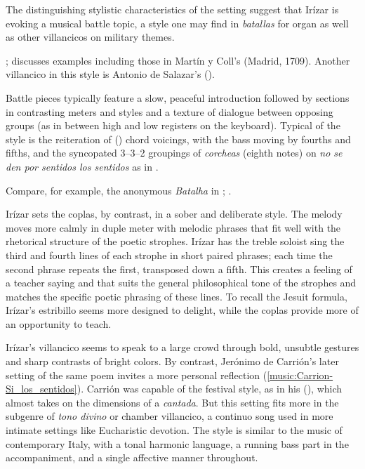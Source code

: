 The distinguishing stylistic characteristics of the setting suggest that Irízar
is evoking a musical battle topic, a style one may find in \emph{batallas} for
organ as well as other villancicos on military themes.%
\begin{Footnote}
    \Autocite[]{Grove}; 
    \autocite{Sutton:IberianBatalla} discusses examples including those in
    Martín y Coll's  (Madrid, 1709).
    Another villancico in this style is Antonio de Salazar's  ().
\end{Footnote}
Battle pieces typically feature a slow, peaceful introduction followed by
sections in contrasting meters and styles and a texture of dialogue between
opposing groups (as in between high and low registers on the keyboard).  
Typical of the style is the reiteration of  () chord voicings, with the bass moving by fourths and fifths, and the
syncopated 3--3--2 groupings of \emph{corcheas} (eighth notes) on \emph{no se
den por sentidos los sentidos} as in .%
\begin{Footnote}
    Compare, for example, the anonymous \emph{Batalha} in ; \autocite{Araujo:Batalla}.  
\end{Footnote}
Irízar sets the coplas, by contrast, in a sober and deliberate style.
The melody moves more calmly in duple meter with melodic phrases that fit well
with the rhetorical structure of the poetic strophes.  
Irízar has the treble soloist sing the third and fourth lines of each strophe in
short paired phrases; each time the second phrase repeats the first, transposed
down a fifth.
This creates a feeling of a teacher saying  and
 that suits the general philosophical tone of the
strophes and matches the specific poetic phrasing of these lines.
To recall the Jesuit formula, Irízar's estribillo seems more designed to
delight, while the coplas provide more of an opportunity to teach.

Irízar's villancico seems to speak to a large crowd through bold, unsubtle
gestures and sharp contrasts of bright colors.
By contrast, Jerónimo de Carrión's later setting of the same poem invites a more
personal reflection (\cref{music:Carrion-Si_los_sentidos}).%
    \Autocite[149--152]{Cashner:WLSCM32}
Carrión was capable of the festival style, as in his  (), which almost takes on the dimensions of a
\emph{cantada}.  
But this setting fits more in the subgenre of \emph{tono divino} or chamber
villancico, a continuo song used in more intimate settings like Eucharistic
devotion.%
    \Autocite[See, for example][]{Robledo:MadridTonos}
The style is similar to the  music of contemporary Italy,
with a tonal harmonic language, a running bass part in the accompaniment, and a
single affective manner throughout.

